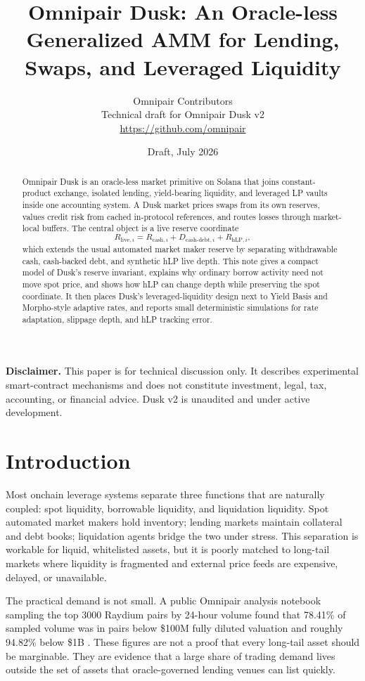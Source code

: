 \documentclass[11pt]{article}
\title{\vspace{-1.4em}Omnipair Dusk: An Oracle-less Generalized AMM for Lending, Swaps, and Leveraged Liquidity}
\author{
  Omnipair Contributors\\[-0.25em]
  \small Technical draft for Omnipair Dusk v2\\[-0.25em]
  \small \url{https://github.com/omnipair}
}
\date{Draft, July 2026}
\newcommand{\cash}{\mathrm{cash}}
\newcommand{\live}{\mathrm{live}}
\newcommand{\hlp}{\mathrm{hLP}}
\newcommand{\debt}{\mathrm{debt}}
\begin{document}
\maketitle
\vspace{-1.2em}

\begin{abstract}
Omnipair Dusk is an oracle-less market primitive on Solana that joins constant-product exchange, isolated lending, yield-bearing liquidity, and leveraged LP vaults inside one accounting system. A Dusk market prices swaps from its own reserves, values credit risk from cached in-protocol references, and routes losses through market-local buffers. The central object is a live reserve coordinate
\[
R_{\live,i}=R_{\cash,i}+D_{\cash\text{-}\debt,i}+R_{\hlp,i},
\]
which extends the usual automated market maker reserve by separating withdrawable cash, cash-backed debt, and synthetic hLP live depth. This note gives a compact model of Dusk's reserve invariant, explains why ordinary borrow activity need not move spot price, and shows how hLP can change depth while preserving the spot coordinate. It then places Dusk's leveraged-liquidity design next to Yield Basis and Morpho-style adaptive rates, and reports small deterministic simulations for rate adaptation, slippage depth, and hLP tracking error.
\end{abstract}

\textbf{Disclaimer.} This paper is for technical discussion only. It describes experimental smart-contract mechanisms and does not constitute investment, legal, tax, accounting, or financial advice. Dusk v2 is unaudited and under active development.

\section{Introduction}

Most onchain leverage systems separate three functions that are naturally coupled: spot liquidity, borrowable liquidity, and liquidation liquidity. Spot automated market makers hold inventory; lending markets maintain collateral and debt books; liquidation agents bridge the two under stress. This separation is workable for liquid, whitelisted assets, but it is poorly matched to long-tail markets where liquidity is fragmented and external price feeds are expensive, delayed, or unavailable.

The practical demand is not small. A public Omnipair analysis notebook sampling the top 3000 Raydium pairs by 24-hour volume found that 78.41\% of sampled volume was in pairs below \$100M fully diluted valuation and roughly 94.82\% below \$1B \cite{omnipair-raydium-notebook}. These figures are not a proof that every long-tail asset should be marginable. They are evidence that a large share of trading demand lives outside the set of assets that oracle-governed lending venues can list quickly.
\end{document}
